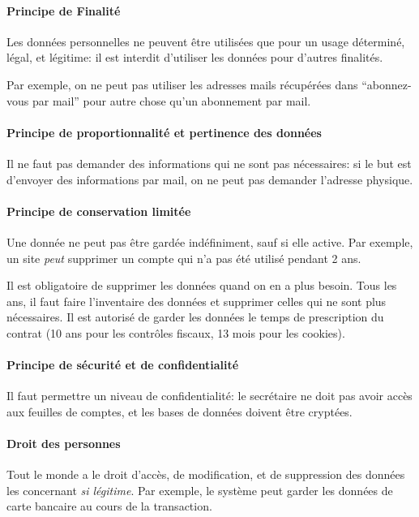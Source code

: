 \documentclass[10pt,a4paper,french]{article}
\begin{document}
\paragraph{Principe de Finalité}
Les données personnelles ne peuvent être utilisées que pour un usage déterminé, légal, et légitime: il est interdit d'utiliser les données pour d'autres finalités.

Par exemple, on ne peut pas utiliser les adresses mails récupérées dans ``abonnez-vous par mail'' pour autre chose qu'un abonnement par mail.

\paragraph{Principe de proportionnalité et pertinence des données}
Il ne faut pas demander des informations qui ne sont pas nécessaires: si le but est d'envoyer des informations par mail, on ne peut pas demander l'adresse physique.

\paragraph{Principe de conservation limitée}
Une donnée ne peut pas être gardée indéfiniment, sauf si elle active.
Par exemple, un site \textit{peut} supprimer un compte qui n'a pas été utilisé pendant 2 ans.

Il est obligatoire de supprimer les données quand on en a plus besoin. Tous les ans, il faut faire l'inventaire des données et supprimer celles qui ne sont plus nécessaires. Il est autorisé de garder les données le temps de prescription du contrat (10 ans pour les contrôles fiscaux, 13 mois pour les cookies).

\paragraph{Principe de sécurité et de confidentialité}
Il faut permettre un niveau de confidentialité: le secrétaire ne doit pas avoir accès aux feuilles de comptes, et les bases de données doivent être cryptées.

\paragraph{Droit des personnes}
Tout le monde a le droit d'accès, de modification, et de suppression des données les concernant \textit{si légitime}. Par exemple, le système peut garder les données de carte bancaire au cours de la transaction.
\end{document}
